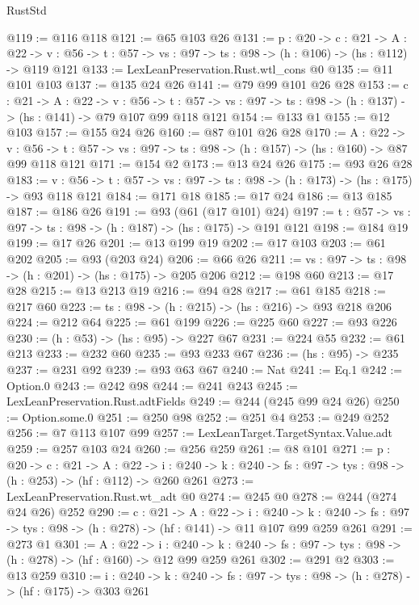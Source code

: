 \begin{lexlean}{RustStd}
\begin{coremodule}
{\begin{coremodule}
{{{{{{@119 := @116 @118
@121 := @65 @103 @26
@131 := {p : @20} ->
  {c : @21} ->
  {A : @22} ->
  {v : @56} -> {t : @57} -> {vs : @97} -> {ts : @98} -> (h : @106) -> (hs : @112) -> @119 @121
@133 := LexLeanPreservation.Rust.wtl_cons @0
@135 := @11 @101 @103
@137 := @135 @24 @26
@141 := @79 @99 @101 @26 @28
@153 := {c : @21} ->
  {A : @22} ->
  {v : @56} ->
  {t : @57} -> {vs : @97} -> {ts : @98} -> (h : @137) -> (hs : @141) -> @79 @107 @99 @118 @121
@154 := @133 @1
@155 := @12 @103
@157 := @155 @24 @26
@160 := @87 @101 @26 @28
@170 := {A : @22} ->
  {v : @56} ->
  {t : @57} -> {vs : @97} -> {ts : @98} -> (h : @157) -> (hs : @160) -> @87 @99 @118 @121
@171 := @154 @2
@173 := @13 @24 @26
@175 := @93 @26 @28
@183 := {v : @56} ->
  {t : @57} -> {vs : @97} -> {ts : @98} -> (h : @173) -> (hs : @175) -> @93 @118 @121
@184 := @171 @18
@185 := @17 @24
@186 := @13 @185
@187 := @186 @26
@191 := @93 (@61 (@17 @101) @24)
@197 := {t : @57} -> {vs : @97} -> {ts : @98} -> (h : @187) -> (hs : @175) -> @191 @121
@198 := @184 @19
@199 := @17 @26
@201 := @13 @199 @19
@202 := @17 @103
@203 := @61 @202
@205 := @93 (@203 @24)
@206 := @66 @26
@211 := {vs : @97} -> {ts : @98} -> (h : @201) -> (hs : @175) -> @205 @206
@212 := @198 @60
@213 := @17 @28
@215 := @13 @213 @19
@216 := @94 @28
@217 := @61 @185
@218 := @217 @60
@223 := {ts : @98} -> (h : @215) -> (hs : @216) -> @93 @218 @206
@224 := @212 @64
@225 := @61 @199
@226 := @225 @60
@227 := @93 @226
@230 := (h : @53) -> (hs : @95) -> @227 @67
@231 := @224 @55
@232 := @61 @213
@233 := @232 @60
@235 := @93 @233 @67
@236 := (hs : @95) -> @235
@237 := @231 @92
@239 := @93 @63 @67
@240 := Nat
@241 := Eq.{1}
@242 := Option.{0}
@243 := @242 @98
@244 := @241 @243
@245 := LexLeanPreservation.Rust.adtFields
@249 := @244 (@245 @99 @24 @26)
@250 := Option.some.{0}
@251 := @250 @98
@252 := @251 @4
@253 := @249 @252
@256 := @7 @113 @107 @99
@257 := LexLeanTarget.TargetSyntax.Value.adt
@259 := @257 @103 @24
@260 := @256 @259
@261 := @8 @101
@271 := {p : @20} ->
  {c : @21} ->
  {A : @22} ->
  {i : @240} -> {k : @240} -> {fs : @97} -> {tys : @98} -> (h : @253) -> (hf : @112) -> @260 @261
@273 := LexLeanPreservation.Rust.wt_adt @0
@274 := @245 @0
@278 := @244 (@274 @24 @26) @252
@290 := {c : @21} ->
  {A : @22} ->
  {i : @240} ->
  {k : @240} -> {fs : @97} -> {tys : @98} -> (h : @278) -> (hf : @141) -> @11 @107 @99 @259 @261
@291 := @273 @1
@301 := {A : @22} ->
  {i : @240} ->
  {k : @240} -> {fs : @97} -> {tys : @98} -> (h : @278) -> (hf : @160) -> @12 @99 @259 @261
@302 := @291 @2
@303 := @13 @259
@310 := {i : @240} ->
  {k : @240} -> {fs : @97} -> {tys : @98} -> (h : @278) -> (hf : @175) -> @303 @261
}}}}}}
\end{coremodule}}
\end{coremodule}
\end{lexlean}
